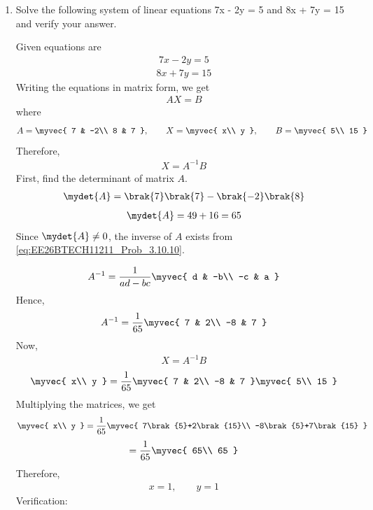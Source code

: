 \begin{enumerate}[label=\thesubsection.\arabic*, ref=\thesubsection.\theenumi]
\item
Solve the following system of linear equations 7x - 2y = 5 and 8x + 7y = 15 and verify your answer.

\solution
Given equations are
\begin{align}
7x - 2y = 5 \label{eq:EE26BTECH11211_Prob_17.1.10}
\end{align}
\begin{align}
8x + 7y = 15\label{eq:EE26BTECH11211_Prob_17.2.10}
\end{align}
Writing the equations in matrix form, we get
\begin{align}
AX=B
\end{align}
where
\begin{align}
A=\myvec{
7 & -2\\
8 & 7
},
\qquad
X=\myvec{
x\\
y
},
\qquad
B=\myvec{
5\\
15
}
\end{align}
Therefore,
\begin{align}
X=A^{-1}B
\end{align}
First, find the determinant of matrix $A$.
\begin{align}
\mydet{A}=\brak{7}\brak{7}-\brak{-2}\brak{8}
\end{align}
\begin{align}
\mydet{A}=49+16=65
\end{align}
Since $\mydet{A}\neq 0$, the inverse of $A$ exists from \eqref{eq:EE26BTECH11211_Prob_3.10.10}.

\begin{align}
A^{-1}=\frac{1}{ad-bc}
\myvec{
d & -b\\
-c & a
}
\end{align}
Hence,
\begin{align}
A^{-1}=\frac{1}{65}
\myvec{
7 & 2\\
-8 & 7
}
\end{align}
Now,
\begin{align}
X=A^{-1}B
\end{align}
\begin{align}
\myvec{
x\\
y
}
=
\frac{1}{65}
\myvec{
7 & 2\\
-8 & 7
}
\myvec{
5\\
15
}
\end{align}
Multiplying the matrices, we get
\begin{align}
\myvec{
x\\
y
}
=
\frac{1}{65}
\myvec{
7\brak{5}+2\brak{15}\\
-8\brak{5}+7\brak{15}
}
\end{align}
\begin{align}
=
\frac{1}{65}
\myvec{
65\\
65
}
\end{align}
Therefore,
\begin{align}
x=1,\qquad y=1
\end{align}
Verification:


\end{enumerate}

